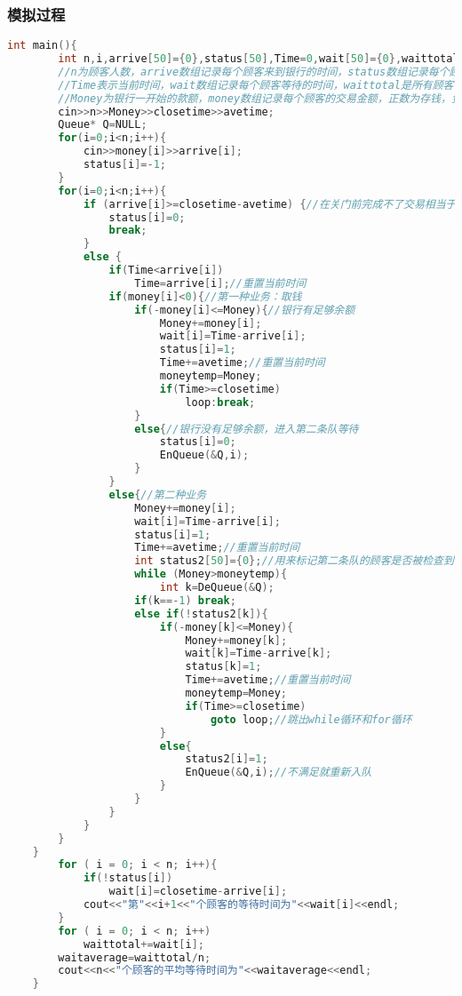 \documentclass{ctexart}
\begin{document}
	\subsubsection{模拟过程}
	\begin{lstlisting}[language=C++, caption=模拟过程]
	int main(){
		int n,i,arrive[50]={0},status[50],Time=0,wait[50]={0},waittotal=0,waitaverage=0,closetime=0,avetime=0,Money=0,money[50]={0},moneytemp=0;
		//n为顾客人数，arrive数组记录每个顾客来到银行的时间，status数组记录每个顾客的状态，-1为没来银行，0为正在等待，1为已离开
		//Time表示当前时间，wait数组记录每个顾客等待的时间，waittotal是所有顾客等待的总时间，waitaverage是顾客等待的平均时间,closetime是银行关门时间,avetime是每笔交易的平均时间
		//Money为银行一开始的款额，money数组记录每个顾客的交易金额，正数为存钱，负数为取钱,moneytemp用来记录第一个队列最后一个客户（第二种业务）接待前银行的剩余款额
		cin>>n>>Money>>closetime>>avetime;
		Queue* Q=NULL;
		for(i=0;i<n;i++){
			cin>>money[i]>>arrive[i];
			status[i]=-1;
		}
		for(i=0;i<n;i++){
			if (arrive[i]>=closetime-avetime) {//在关门前完成不了交易相当于一直等到关门
				status[i]=0;
				break;
			}
			else {
				if(Time<arrive[i])
					Time=arrive[i];//重置当前时间
				if(money[i]<0){//第一种业务：取钱
					if(-money[i]<=Money){//银行有足够余额
						Money+=money[i];
						wait[i]=Time-arrive[i];
						status[i]=1;
						Time+=avetime;//重置当前时间
						moneytemp=Money;
						if(Time>=closetime)
							loop:break;
					}
					else{//银行没有足够余额，进入第二条队等待
						status[i]=0;
						EnQueue(&Q,i);
					}
				}
				else{//第二种业务
					Money+=money[i];
					wait[i]=Time-arrive[i];
					status[i]=1;
					Time+=avetime;//重置当前时间
					int status2[50]={0};//用来标记第二条队的顾客是否被检查到，没检查是0，检查到是1
					while (Money>moneytemp){
						int k=DeQueue(&Q);
                	if(k==-1) break;
                	else if(!status2[k]){
						if(-money[k]<=Money){
							Money+=money[k];
							wait[k]=Time-arrive[k];
							status[k]=1;
							Time+=avetime;//重置当前时间
							moneytemp=Money;
							if(Time>=closetime)
								goto loop;//跳出while循环和for循环
						}
						else{
							status2[i]=1;
							EnQueue(&Q,i);//不满足就重新入队
						}
					}
				}
			}
		}
	}
		for ( i = 0; i < n; i++){
			if(!status[i])
				wait[i]=closetime-arrive[i];
			cout<<"第"<<i+1<<"个顾客的等待时间为"<<wait[i]<<endl;
		}
		for ( i = 0; i < n; i++)
			waittotal+=wait[i];
		waitaverage=waittotal/n;
		cout<<n<<"个顾客的平均等待时间为"<<waitaverage<<endl;
	}
	\end{lstlisting}
	
\end{document}
